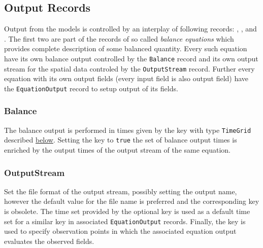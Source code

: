 \subsection{Output Records}
Output from the models is controlled by an interplay of following records: ,
, and . The first two are part of the 
records of so called {\it balance equations} which provides complete description of some balanced quantity. 
Every such equation have its own balance output controlled by the \verb'Balance' record and its own output stream for the 
spatial data controled by the \verb'OutputStream' record. Further every equation with its own output fields 
(every input field is also output field) have the \verb'EquationOutput' record to setup output of its fields.

\subsubsection{Balance}
The balance output is performed in times given by the key 
with type \verb'TimeGrid' described \hyperlink{sec:TimeGrid}{below}. Setting the key  
to \verb'true' the set of balance output times is enriched by the output times of the output stream of the same equation.

\subsubsection{OutputStream}
Set the file format of the output stream, possibly setting the output name, however the default value for the file name is preferred and the corresponding key 
 is obsolete.
The time set provided by the optional key  is used as a default time set for a similar key in associated 
\verb'EquationOutput' records. Finally, the key  is used to specify observation points
in which the associated equation output evaluates the observed fields.

